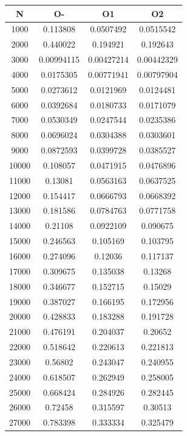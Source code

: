 \begin{center}
\begin{tabular}{| c | c | c | c |}
\hline
\textbf{N} & \textbf{O-} & \textbf{O1} & \textbf{O2} \\ \hline
1000 & 0.113808 & 0.0507492 & 0.0515542 \\ \hline
2000 & 0.440022 & 0.194921 & 0.192643 \\ \hline
3000 & 0.00994115 & 0.00427214 & 0.00442329 \\ \hline
4000 & 0.0175305 & 0.00771941 & 0.00797904 \\ \hline
5000 & 0.0273612 & 0.0121969 & 0.0124481 \\ \hline
6000 & 0.0392684 & 0.0180733 & 0.0171079 \\ \hline
7000 & 0.0530349 & 0.0247544 & 0.0235386 \\ \hline
8000 & 0.0696024 & 0.0304388 & 0.0303601 \\ \hline
9000 & 0.0872593 & 0.0399728 & 0.0385527 \\ \hline
10000 & 0.108057 & 0.0471915 & 0.0476896 \\ \hline
11000 & 0.13081 & 0.0563163 & 0.0637525 \\ \hline
12000 & 0.154417 & 0.0666793 & 0.0668392 \\ \hline
13000 & 0.181586 & 0.0784763 & 0.0771758 \\ \hline
14000 & 0.21108 & 0.0922109 & 0.090675 \\ \hline
15000 & 0.246563 & 0.105169 & 0.103795 \\ \hline
16000 & 0.274096 & 0.12036 & 0.117137 \\ \hline
17000 & 0.309675 & 0.135038 & 0.13268 \\ \hline
18000 & 0.346677 & 0.152715 & 0.15029 \\ \hline
19000 & 0.387027 & 0.166195 & 0.172956 \\ \hline
20000 & 0.428833 & 0.183288 & 0.191728 \\ \hline
21000 & 0.476191 & 0.204037 & 0.20652 \\ \hline
22000 & 0.518642 & 0.220613 & 0.221813 \\ \hline
23000 & 0.56802 & 0.243047 & 0.240955 \\ \hline
24000 & 0.618507 & 0.262949 & 0.258005 \\ \hline
25000 & 0.668424 & 0.284926 & 0.282445 \\ \hline
26000 & 0.72458 & 0.315597 & 0.30513 \\ \hline
27000 & 0.783398 & 0.333334 & 0.325479 \\ \hline

\end{tabular}
\end{center}
